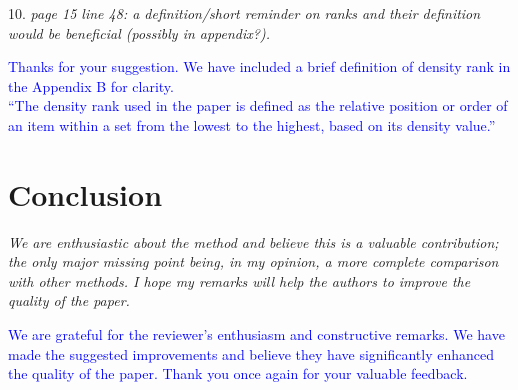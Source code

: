 \documentclass{article}
\begin{document}
10. \textit{page 15 line 48: a definition/short reminder on ranks and their definition would be beneficial (possibly in appendix?).}

   \textcolor{blue}{
   Thanks for your suggestion. We have included a brief definition of density rank in the Appendix B for clarity. \\
   ``The density rank used in the paper is defined as the relative position or order of an item within a set from the lowest to the highest, based on its density value.''
   }

\section*{Conclusion}

\textit{We are enthusiastic about the method and believe this is a valuable contribution; the only major missing point being, in my opinion, a more complete comparison with other methods. I hope my remarks will help the authors to improve the quality of the paper.}

\vspace{0.5cm}

\textcolor{blue}{We are grateful for the reviewer's enthusiasm and constructive remarks. We have made the suggested improvements and believe they have significantly enhanced the quality of the paper. Thank you once again for your valuable feedback.}

% 
% 

\printbibliography
\end{document}
